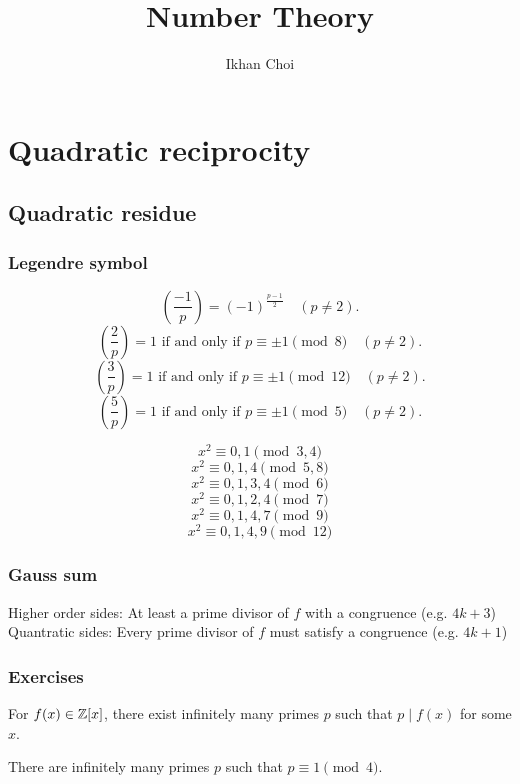 \documentclass{../../large}
\begin{document}
\title{Number Theory}
\author{Ikhan Choi}
\maketitle
\tableofcontents

\part{Quadratic reciprocity}
\chapter{Quadratic residue}
\section{Legendre symbol}
\begin{prb}
\[\left(\frac{-1}p\right)=(-1)^{\frac{p-1}2}\quad(p\ne2).\]
\[\left(\frac2p\right)=1\text{ if and only if }p\equiv\pm1\pmod8\quad(p\ne2).\]
\[\left(\frac3p\right)=1\text{ if and only if }p\equiv\pm1\pmod{12}\quad(p\ne2).\]
\[\left(\frac5p\right)=1\text{ if and only if }p\equiv\pm1\pmod5\quad(p\ne2).\]
\end{prb}
\begin{prb}
\[x^2\equiv0,1\pmod{3,4}\]
\[x^2\equiv0,1,4\pmod{5,8}\]
\[x^2\equiv0,1,3,4\pmod{6}\]
\[x^2\equiv0,1,2,4\pmod{7}\]
\[x^2\equiv0,1,4,7\pmod{9}\]
\[x^2\equiv0,1,4,9\pmod{12}\]
\end{prb}


\section{Gauss sum}





Higher order sides: At least a prime divisor of $f$ with a congruence (e.g. $4k+3$)
Quantratic sides: Every prime divisor of $f$ must satisfy a congruence (e.g. $4k+1$)


\section*{Exercises}
\begin{prb}
\begin{parts}
\item For $f(x)\in\mathbb{Z}[x]$, there exist infinitely many primes $p$ such that $p\mid f(x)$ for some $x$.
\item There are infinitely many primes $p$ such that $p\equiv1\pmod4$.
\end{parts}
\end{prb}
\end{document}

